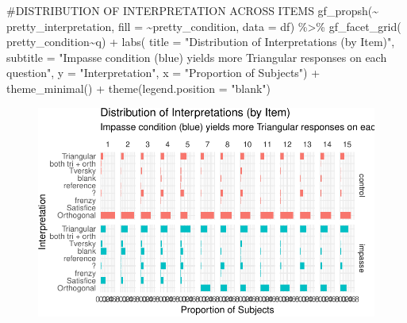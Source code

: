 \documentclass[
  letterpaper,
  DIV=11,
  numbers=noendperiod]{scrreprt}
\newenvironment{Shaded}{\begin{snugshade}}{\end{snugshade}}
\newcommand{\AttributeTok}[1]{\textcolor[rgb]{0.40,0.45,0.13}{#1}}
\newcommand{\CommentTok}[1]{\textcolor[rgb]{0.37,0.37,0.37}{#1}}
\newcommand{\FunctionTok}[1]{\textcolor[rgb]{0.28,0.35,0.67}{#1}}
\newcommand{\NormalTok}[1]{\textcolor[rgb]{0.00,0.23,0.31}{#1}}
\newcommand{\SpecialCharTok}[1]{\textcolor[rgb]{0.37,0.37,0.37}{#1}}
\newcommand{\StringTok}[1]{\textcolor[rgb]{0.13,0.47,0.30}{#1}}
\begin{document}
\begin{Shaded}
\begin{Highlighting}[]
\CommentTok{\#DISTRIBUTION OF INTERPRETATION ACROSS ITEMS}
\FunctionTok{gf\_propsh}\NormalTok{(}\SpecialCharTok{\textasciitilde{}}\NormalTok{ pretty\_interpretation, }\AttributeTok{fill =} \SpecialCharTok{\textasciitilde{}}\NormalTok{pretty\_condition, }\AttributeTok{data =}\NormalTok{ df) }\SpecialCharTok{\%\textgreater{}\%} 
  \FunctionTok{gf\_facet\_grid}\NormalTok{( pretty\_condition}\SpecialCharTok{\textasciitilde{}}\NormalTok{q) }\SpecialCharTok{+} 
  \FunctionTok{labs}\NormalTok{( }\AttributeTok{title =} \StringTok{"Distribution of Interpretations (by Item)"}\NormalTok{,}
        \AttributeTok{subtitle =} \StringTok{"Impasse condition (blue) yields more Triangular responses on each question"}\NormalTok{,}
        \AttributeTok{y =} \StringTok{"Interpretation"}\NormalTok{, }\AttributeTok{x =} \StringTok{"Proportion of Subjects"}\NormalTok{) }\SpecialCharTok{+} \FunctionTok{theme\_minimal}\NormalTok{() }\SpecialCharTok{+} \FunctionTok{theme}\NormalTok{(}\AttributeTok{legend.position =} \StringTok{"blank"}\NormalTok{)}
\end{Highlighting}
\end{Shaded}

\begin{figure}[H]

{\centering \includegraphics{analysis/SGC3A/2_sgc3A_scoring_files/figure-pdf/DISTR-INTERPRETATIONS-2.pdf}

}

\end{figure}
\end{document}
